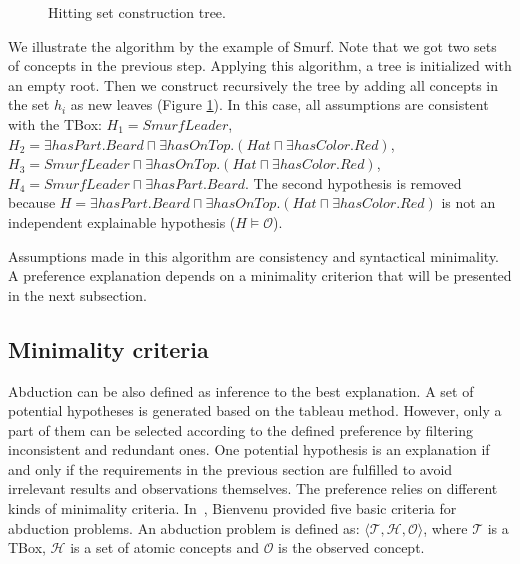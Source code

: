 \documentclass{article}
\begin{document}
\begin{figure}
\centering
{}
\caption{Hitting set construction tree.\label{fig:hittingtree}}
\end{figure}
We illustrate the algorithm by the example of Smurf. Note that we got two sets of concepts in the previous step.
Applying this algorithm, a tree is initialized with an empty root. Then we construct recursively the tree by adding all concepts
in the set $h_i$ as new leaves (Figure \ref{fig:hittingtree}). In this case, all
assumptions are consistent with the TBox:
$H_1=SmurfLeader$, $H_2=\exists hasPart.Beard \sqcap \exists hasOnTop.(Hat\sqcap\exists hasColor.Red)$, 
$H_3=SmurfLeader\sqcap\exists hasOnTop.(Hat\sqcap \exists hasColor.Red)$, $H_4=SmurfLeader \sqcap \exists hasPart.Beard$. 
The second hypothesis is removed because $H=\exists hasPart.Beard \sqcap \exists hasOnTop.(Hat\sqcap\exists hasColor.Red)$ 
is not an independent explainable hypothesis ($H\vDash \mathcal{O}$). 

Assumptions made in this algorithm are consistency and syntactical minimality. 
A preference explanation depends on a minimality criterion that will be presented in the next subsection.

\subsection{Minimality criteria}
Abduction can be also defined as inference to the best explanation.
A set of potential hypotheses is generated based on the tableau method. However, only a part of them can be selected according to the defined preference by filtering inconsistent and redundant ones. 
One potential hypothesis is an explanation if and only if the requirements in the previous section are fulfilled to avoid irrelevant results and observations themselves.
The preference relies on different kinds of minimality criteria. 
In~\cite{bienvenu08complexity}, Bienvenu provided five basic criteria for abduction problems.
An abduction problem is defined as: $ \langle \mathcal{T}, \mathcal{H}, \mathcal{O}\rangle$, where $\mathcal{T}$ is a TBox, $\mathcal{H}$ is a set of atomic concepts and $\mathcal{O}$ is the observed concept.
\end{document}
